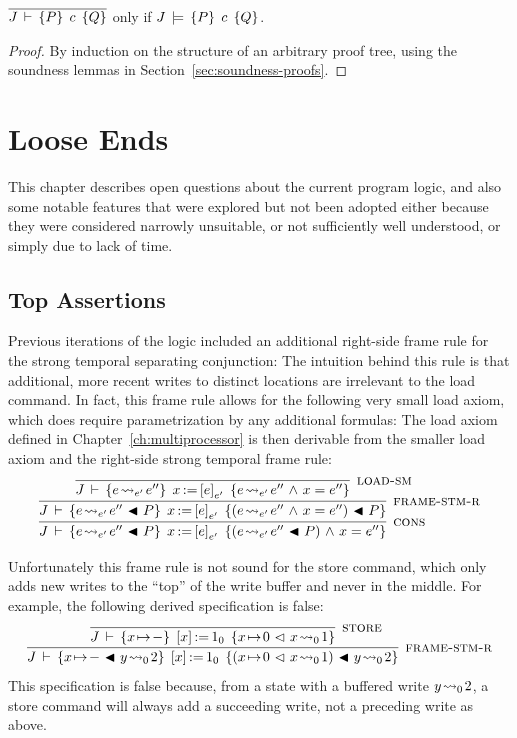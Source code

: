 \documentclass[11pt]{report}
\begin{document}
\begin{theorem}[Soundness]
  \label{thm:soundness}
	$\overline{J\,\vdash\,\left\lbrace P \right\rbrace\;c\;\left\lbrace Q \right\rbrace}$ only if $J\,\models\,\left\lbrace P \right\rbrace\;c\;\left\lbrace Q \right\rbrace$. 
\end{theorem}

\begin{proof}
	By induction on the structure of an arbitrary proof tree, using the soundness lemmas in Section~\ref{sec:soundness-proofs}. 
\end{proof}

\chapter{Loose Ends}

This chapter describes open questions about the current program logic, and also some notable features that were explored but not been adopted either because they were considered narrowly unsuitable, or not sufficiently well understood, or simply due to lack of time. 

\section{Top Assertions}
\label{sec:top-assertion}

Previous iterations of the logic included an additional right-side frame rule for the strong temporal separating conjunction:  The intuition behind this rule is that additional, more recent writes to distinct locations are irrelevant to the load command. In fact, this frame rule allows for the following very small load axiom, which does require parametrization by any additional formulas:  The load axiom defined in Chapter~\ref{ch:multiprocessor} is then derivable from the smaller load axiom and the right-side strong temporal frame rule: \[ \infer[\textsc{cons}]{\spec{J}{e \fwrite{e'} e'' \fsseq P}{\cload{x}{e}_{e'}}{(e \fwrite{e'} e'' \fsseq P) \conj x = e''}}{\infer[\textsc{frame-stm-r}]{\spec{J}{e \fwrite{e'} e'' \fsseq P}{\cload{x}{e}_{e'}}{(e \fwrite{e'} e'' \conj x = e'') \fsseq P }}{\infer[\textsc{load-sm}]{\spec{J}{e \fwrite{e'} e''}{\cload{x}{e}_{e'}}{e \fwrite{e'} e'' \conj x = e''}}{}}}\]

Unfortunately this frame rule is not sound for the store command, which only adds new writes to the ``top'' of the write buffer and never in the middle. For example, the following derived specification is false: \[ \infer[\textsc{frame-stm-r}]{\spec{J}{x \fpointsto - \fsseq y \fwrite{0} 2}{\cstore{x}{1}_0}{(x \fpointsto 0 \fseq x \fwrite{0} 1) \fsseq y \fwrite{0} 2}}{\infer[\textsc{store}]{\spec{J}{x \fpointsto - }{\cstore{x}{1}_0}{x \fpointsto 0 \fseq x \fwrite{0} 1}}{}}\] This specification is false because, from a state with a buffered write $y \!\leadsto_{0}\! 2$, a store command will always add a succeeding write, not a preceding write as above. 
\end{document}
